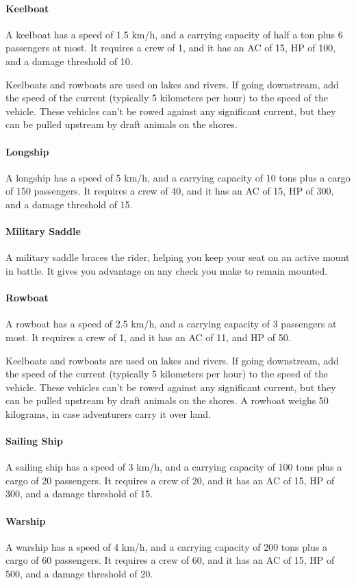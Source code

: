     \paragraph{Keelboat}
        A keelboat has a speed of 1.5 km/h, and a carrying capacity of half a ton plus 6 passengers at most.
        It requires a crew of 1, and it has an AC of 15, HP of 100, and a damage threshold of 10.

        Keelboats and rowboats are used on lakes and rivers.
        If going downstream, add the speed of the current (typically 5 kilometers per hour) to the speed of the vehicle.
        These vehicles can't be rowed against any significant current, but they can be pulled upstream by draft animals on the shores.
    \paragraph{Longship}
        A longship has a speed of 5 km/h, and a carrying capacity of 10 tons plus a cargo of 150 passengers.
        It requires a crew of 40, and it has an AC of 15, HP of 300, and a damage threshold of 15.
    \paragraph{Military Saddle}
        A military saddle braces the rider, helping you keep your seat on an active mount in battle.
        It gives you advantage on any check you make to remain mounted.
    \paragraph{Rowboat}
        A rowboat has a speed of 2.5 km/h, and a carrying capacity of 3 passengers at most.
        It requires a crew of 1, and it has an AC of 11, and HP of 50.

        Keelboats and rowboats are used on lakes and rivers.
        If going downstream, add the speed of the current (typically 5 kilometers per hour) to the speed of the vehicle.
        These vehicles can't be rowed against any significant current, but they can be pulled upstream by draft animals on the shores.
        A rowboat weighs 50 kilograms, in case adventurers carry it over land.
    \paragraph{Sailing Ship}
        A sailing ship has a speed of 3 km/h, and a carrying capacity of 100 tons plus a cargo of 20 passengers.
        It requires a crew of 20, and it has an AC of 15, HP of 300, and a damage threshold of 15.
    \paragraph{Warship}
        A warship has a speed of 4 km/h, and a carrying capacity of 200 tons plus a cargo of 60 passengers.
        It requires a crew of 60, and it has an AC of 15, HP of 500, and a damage threshold of 20.
\newpage
